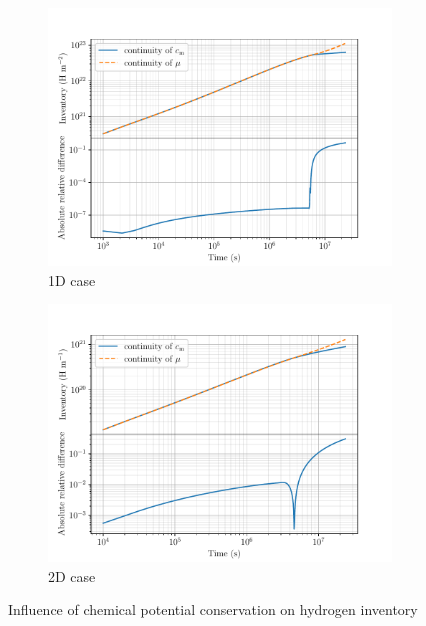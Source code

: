 \begin{figure}
    \centering
    \begin{subfigure}{1\linewidth}
        \includegraphics[width=\linewidth]{Figures/Chapter3/monoblocks/interface_condition/iter case/comparison_inventory_1d.pdf}
        \caption{1D case}
        \label{fig: 1D inventories}
    \end{subfigure}
    \begin{subfigure}{1\linewidth} 
        \includegraphics[width=\linewidth]{Figures/Chapter3/monoblocks/interface_condition/iter case/comparison_inventory_2d.pdf}
        \caption{2D case}
        \label{fig: 2D inventories}
    \end{subfigure}
    \caption{Influence of chemical potential conservation on hydrogen inventory}
\end{figure}

